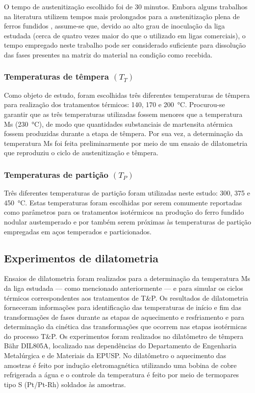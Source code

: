 O tempo de austenitização escolhido foi de 30 minutos. Embora alguns trabalhos na literatura utilizem tempos mais prolongados para a austenitização plena de ferros fundidos \cite{Trudel1997}, assume-se que, devido ao alto grau de inoculação da liga estudada (cerca de quatro vezes maior do que o utilizado em ligas comerciais), o tempo empregado neste trabalho pode ser considerado suficiente para dissolução das fases presentes na matriz do material na condição como recebida.

\subsubsection*{Temperaturas de têmpera $(T_T)$} 

Como objeto de estudo, foram escolhidas três diferentes temperaturas de têmpera para realização dos tratamentos térmicos: 140, 170 e \SI{200}{\degreeCelsius}. Procurou-se garantir que as três temperaturas utilizadas fossem menores que a temperatura Ms (\SI{230}{\degreeCelsius}), de modo que quantidades substanciais de martensita atérmica fossem produzidas durante a etapa de têmpera. Por sua vez, a determinação da temperatura Ms foi feita preliminarmente por meio de um ensaio de dilatometria que reproduziu o ciclo de austenitização e têmpera.

\subsubsection*{Temperaturas de partição $(T_P)$}

Três diferentes temperaturas de partição foram utilizadas neste estudo: 300, 375 e \SI{450}{\degreeCelsius}. Estas temperaturas foram escolhidas por serem comumente reportadas como parâmetros para os tratamentos isotérmicos na produção do ferro fundido nodular austemperado e por também serem próximas às temperaturas de partição empregadas em aços temperados e particionados.


\subsection{Experimentos de dilatometria}

\label{subsec:dilatometria}

Ensaios de dilatometria foram realizados para a determinação da temperatura Ms da liga estudada --- como mencionado anteriormente --- e para simular os ciclos térmicos correspondentes aos tratamentos de T\&P. Os resultados de dilatometria forneceram informações para identificação das temperaturas de início e fim das transformações de fases durante as etapas de aquecimento e resfriamento e para determinação da cinética das transformações que ocorrem nas etapas isotérmicas do processo T\&P. Os experimentos foram realizados no dilatômetro de têmpera Bähr DIL805A, localizado nas dependências do Departamento de Engenharia Metalúrgica e de Materiais da EPUSP. No dilatômetro o aquecimento das amostras é feito por indução eletromagnética utilizando uma bobina de cobre refrigerada a água e o controle da temperatura é feito por meio de termopares tipo S (Pt/Pt-Rh) soldados às amostras.

